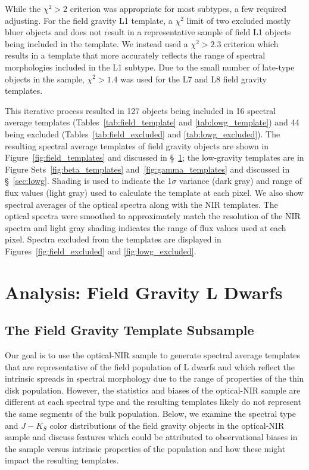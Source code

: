\documentclass[12pt,preprint]{aastex}
\begin{document}
While the $\chi^2 > 2$ criterion was appropriate for most subtypes, a few required adjusting.
For the field gravity L1 template, a $\chi^2$ limit of two excluded mostly bluer objects and does not result in a representative sample of field L1 objects being included in the template.
We instead used a $\chi^2 > 2.3$ criterion which results in a template that more accurately reflects the range of spectral morphologies included in the L1 subtype.
Due to the small number of late-type objects in the sample, $\chi^2 > 1.4$ was used for the L7 and L8 field gravity templates.

This iterative process resulted in 127 objects being included in 16 spectral average templates (Tables~\ref{tab:field_template} and \ref{tab:lowg_template}) and 44 being excluded (Tables~\ref{tab:field_excluded} and \ref{tab:lowg_excluded}).
The resulting spectral average templates of field gravity objects are shown in Figure~\ref{fig:field_templates} and discussed in \S~\ref{sec:fieldg}; the low-gravity templates are in Figure Sets~\ref{fig:beta_templates} and~\ref{fig:gamma_templates} and discussed in \S~\ref{sec:lowg}.
Shading is used to indicate the 1$\sigma$ variance (dark gray) and range of flux values (light gray) used to calculate the template at each pixel.
We also show spectral averages of the optical spectra along with the NIR templates. The optical spectra were smoothed to approximately match the resolution of the NIR spectra and light gray shading indicates the range of flux values used at each pixel.
Spectra excluded from the templates are displayed in Figures~\ref{fig:field_excluded} and \ref{fig:lowg_excluded}.

\clearpage
\section{Analysis: Field Gravity L Dwarfs}
\label{sec:fieldg}

\subsection{The Field Gravity Template Subsample}
\label{sec:templates_normal}

Our goal is to use the optical-NIR sample to generate spectral average templates that are representative of the field population of L dwarfs and which reflect the intrinsic spreads in spectral morphology due to the range of properties of the thin disk population.
However, the statistics and biases of the optical-NIR sample are different at each spectral type and the resulting templates likely do not represent the same segments of the bulk population.
Below, we examine the spectral type and $J-K_S$ color distributions of the field gravity objects in the optical-NIR sample and discuss features which could be attributed to observational biases in the sample versus intrinsic properties of the population and how these might impact the resulting templates.
\end{document}
